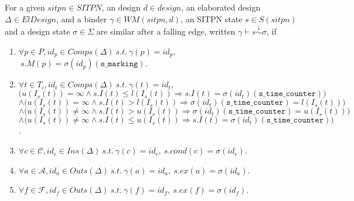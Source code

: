 \documentclass[dvipsnames,12pt]{article}
\begin{document}
\begin{definition}
  \label{def:post-fe-state-sim}
  For a given $sitpn\in{}SITPN$, an \hvhdl{} design $d\in{}design$, an
  elaborated design $\Delta\in{}ElDesign$, and a binder
  $\gamma\in{}WM(sitpn,d)$, an SITPN state $s\in{}S(sitpn)$ and a
  design state $\sigma\in\Sigma$ are similar after a falling edge,
  written $\gamma\vdash{}s\stackrel{\downarrow}{\sim}\sigma$, if
  \begin{enumerate}
  \item $\forall{}p\in{}P,id_p\in{}Comps(\Delta)~s.t.~\gamma(p)=id_p,$
    $~s.M(p)=\sigma(id_p)(\texttt{s\_marking})$.
  \item
    $\forall{}t\in{}T_i,id_t\in{}Comps(\Delta)~s.t.~\gamma(t)=id_t,$\\
    $\big(u(I_s(t))=\infty\land{}s.I(t)\le{}l(I_s(t))\Rightarrow{}s.I(t)=\sigma(id_t)(\texttt{s\_time\_counter})\big)$\\
    $\land\big(u(I_s(t))=\infty\land{}s.I(t)>{}l(I_s(t))\Rightarrow{}\sigma(id_t)(\texttt{s\_time\_counter})=l(I_s(t))\big)$\\
    $\land\big(u(I_s(t))\neq\infty\land{}s.I(t)>{}u(I_s(t))\Rightarrow{}\sigma(id_t)(\texttt{s\_time\_counter})=u(I_s(t))\big)$\\
    $\land\big(u(I_s(t))\neq\infty\land{}s.I(t)\le{}u(I_s(t))\Rightarrow{}s.I(t)=\sigma(id_t)(\texttt{s\_time\_counter})\big)$.
  \item
    $\forall{}c\in\mathcal{C},id_c\in{}Ins(\Delta)~s.t.~\gamma(c)=id_c,~s.cond(c)=\sigma(id_c)$.
  \item
    $\forall{}a\in\mathcal{A},id_a\in{}Outs(\Delta)~s.t.~\gamma(a)=id_a,~s.ex(a)=\sigma(id_a)$.
  \item
    $\forall{}f\in\mathcal{F},id_f\in{}Outs(\Delta)~s.t.~\gamma(f)=id_f,~s.ex(f)=\sigma(id_f)$.
  \end{enumerate}
\end{definition}
\end{document}
